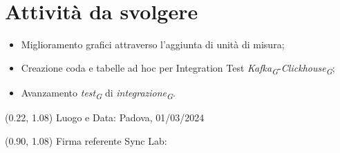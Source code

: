\documentclass{article}
\begin{document}
\section{Attività da svolgere}
    \begin{itemize}
        \item Miglioramento grafici attraverso l'aggiunta di unità di misura;
        \item Creazione coda e tabelle ad hoc per Integration Test \textit{Kafka}\textsubscript{\textit{G}}-\textit{Clickhouse}\textsubscript{\textit{G}};
        \item Avanzamento \textit{test}\textsubscript{\textit{G}} di \textit{integrazione}\textsubscript{\textit{G}}.
    \end{itemize}

\begin{textblock*}{\textwidth}(0.22\textwidth, 1.08\textheight)
    Luogo e Data: Padova, 01/03/2024
\end{textblock*}

\begin{textblock*}{\textwidth}(0.90\textwidth, 1.08\textheight)
        Firma referente Sync Lab:
\end{textblock*}
\end{document}

